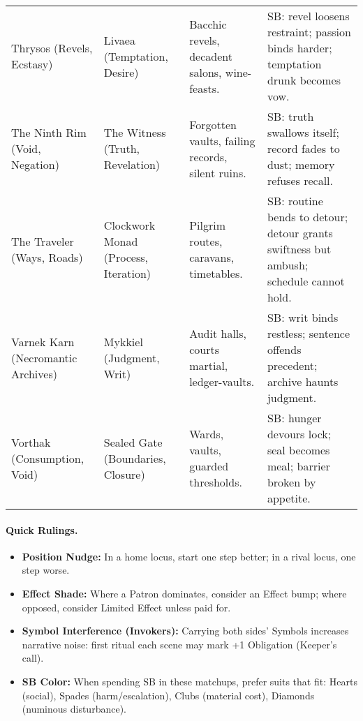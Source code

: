 \begin{longtable}{@{}p{3.3cm}p{3.3cm}p{4.6cm}p{7.2cm}@{}}
  Thrysos (Revels, Ecstasy) & Livaea (Temptation, Desire) &
  Bacchic revels, decadent salons, wine-feasts. &
  SB: revel loosens restraint; passion binds harder; temptation drunk becomes vow. \\

  The Ninth Rim (Void, Negation) & The Witness (Truth, Revelation) &
  Forgotten vaults, failing records, silent ruins. &
  SB: truth swallows itself; record fades to dust; memory refuses recall. \\

  The Traveler (Ways, Roads) & Clockwork Monad (Process, Iteration) &
  Pilgrim routes, caravans, timetables. &
  SB: routine bends to detour; detour grants swiftness but ambush; schedule cannot hold. \\

  Varnek Karn (Necromantic Archives) & Mykkiel (Judgment, Writ) &
  Audit halls, courts martial, ledger-vaults. &
  SB: writ binds restless; sentence offends precedent; archive haunts judgment. \\

  Vorthak (Consumption, Void) & Sealed Gate (Boundaries, Closure) &
  Wards, vaults, guarded thresholds. &
  SB: hunger devours lock; seal becomes meal; barrier broken by appetite. \\

\end{longtable}

\paragraph{Quick Rulings.}
\begin{itemize}
  \item \textbf{Position Nudge:} In a home locus, start one step better; in a rival locus, one step worse.
  \item \textbf{Effect Shade:} Where a Patron dominates, consider an Effect bump; where opposed, consider Limited Effect unless paid for.
  \item \textbf{Symbol Interference (Invokers):} Carrying both sides’ Symbols increases narrative noise: first ritual each scene may mark +1 Obligation (Keeper’s call).
  \item \textbf{SB Color:} When spending SB in these matchups, prefer suits that fit: Hearts (social), Spades (harm/escalation), Clubs (material cost), Diamonds (numinous disturbance).
\end{itemize}

